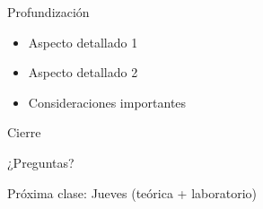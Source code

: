 \documentclass[10pt]{beamer}
\begin{document}
\begin{frame}{Profundización}
    \begin{itemize}
        \item Aspecto detallado 1
        \item Aspecto detallado 2
        \item Consideraciones importantes
    \end{itemize}
\end{frame}


\begin{frame}{Cierre}
    \begin{center}
        \Large{¿Preguntas?}
        
        \vspace{1cm}
        
        Próxima clase: Jueves (teórica + laboratorio)
    \end{center}
\end{frame}
\end{document}

